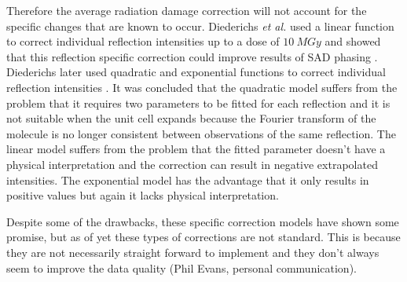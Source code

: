 		Therefore the average radiation damage correction will not account for the specific changes that are known to occur.
		Diederichs \textit{et al.} used a linear function to correct individual reflection intensities up to a dose of $10\ MGy$ and showed that this reflection specific correction could improve results of SAD phasing \cite{diederichs2003}.
		Diederichs later used quadratic and exponential functions to correct individual reflection intensities \cite{diederichs2006}.
		It was concluded that the quadratic model suffers from the problem that it requires two parameters to be fitted for each reflection and it is not suitable when the unit cell expands because the Fourier transform of the molecule is no longer consistent between observations of the same reflection.
		The linear model suffers from the problem that the fitted parameter doesn't have a physical interpretation and the correction can result in negative extrapolated intensities.
		The exponential model has the advantage that it only results in positive values but again it lacks physical interpretation.

		Despite some of the drawbacks, these specific correction models have shown some promise, but as of yet these types of corrections are not standard. This is because they are not necessarily straight forward to implement and they don't always seem to improve the data quality (Phil Evans, personal communication).
